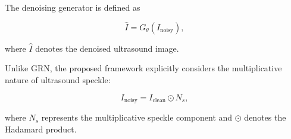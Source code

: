 \documentclass[conference]{IEEEtran}
\begin{document}
The denoising generator is defined as

\begin{equation}
\hat I
=
G_{\theta}
\left(
I_{\mathrm{noisy}}
\right),
\end{equation}

where $\hat I$ denotes the denoised ultrasound image.

Unlike GRN, the proposed framework explicitly considers the
multiplicative nature of ultrasound speckle:

\begin{equation}
I_{\mathrm{noisy}}
=
I_{\mathrm{clean}}
\odot N_s,
\label{eq:speckle_model}
\end{equation}

where $N_s$ represents the multiplicative speckle component and
$\odot$ denotes the Hadamard product.


\end{document}
